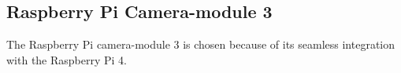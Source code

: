 \documentclass[a4paper,8pt]{article}
\begin{document}
%

\subsection{Raspberry Pi Camera-module 3}

The Raspberry Pi camera-module 3 is chosen because of its seamless
integration with the Raspberry Pi 4.

%

%
%
\end{document}
